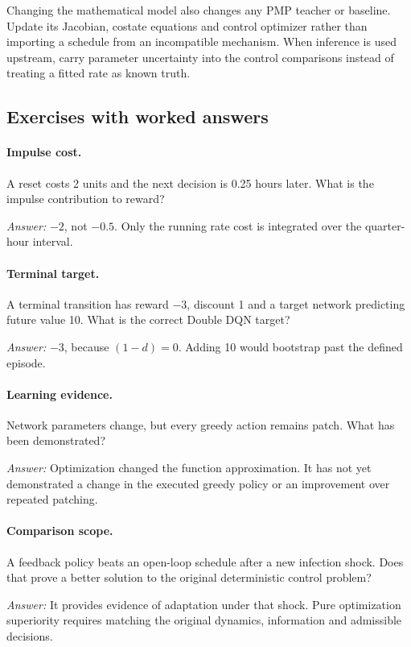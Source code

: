 \documentclass[11pt,a4paper]{article}
\theoremstyle{definition}
\theoremstyle{remark}
\begin{document}
Changing the mathematical model also changes any PMP teacher or baseline. Update its Jacobian, costate equations and control optimizer rather than importing a schedule from an incompatible mechanism. When inference is used upstream, carry parameter uncertainty into the control comparisons instead of treating a fitted rate as known truth.

\subsection{Exercises with worked answers}
\paragraph{Impulse cost.} A reset costs 2 units and the next decision is 0.25 hours later. What is the impulse contribution to reward?\par
\emph{Answer:} $-2$, not $-0.5$. Only the running rate cost is integrated over the quarter-hour interval.

\paragraph{Terminal target.} A terminal transition has reward $-3$, discount 1 and a target network predicting future value 10. What is the correct Double DQN target?\par
\emph{Answer:} $-3$, because $(1-d)=0$. Adding 10 would bootstrap past the defined episode.

\paragraph{Learning evidence.} Network parameters change, but every greedy action remains patch. What has been demonstrated?\par
\emph{Answer:} Optimization changed the function approximation. It has not yet demonstrated a change in the executed greedy policy or an improvement over repeated patching.

\paragraph{Comparison scope.} A feedback policy beats an open-loop schedule after a new infection shock. Does that prove a better solution to the original deterministic control problem?\par
\emph{Answer:} It provides evidence of adaptation under that shock. Pure optimization superiority requires matching the original dynamics, information and admissible decisions.
\end{document}
